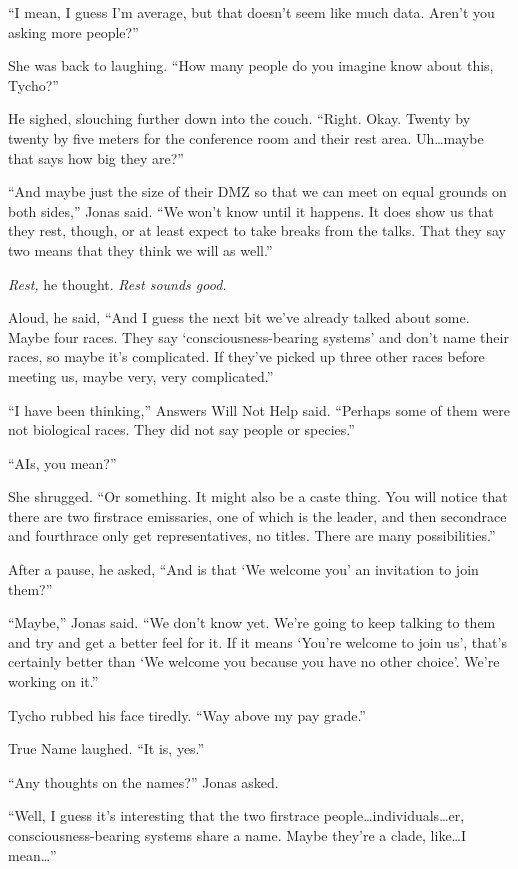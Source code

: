 ``I mean, I guess I'm average, but that doesn't seem like much data. Aren't you asking more people?''

She was back to laughing. ``How many people do you imagine know about this, Tycho?''

He sighed, slouching further down into the couch. ``Right. Okay. Twenty by twenty by five meters for the conference room and their rest area. Uh\ldots maybe that says how big they are?''

``And maybe just the size of their DMZ so that we can meet on equal grounds on both sides,'' Jonas said. ``We won't know until it happens. It does show us that they rest, though, or at least expect to take breaks from the talks. That they say two means that they think we will as well.''

\emph{Rest,} he thought. \emph{Rest sounds good.}

Aloud, he said, ``And I guess the next bit we've already talked about some. Maybe four races. They say `consciousness-bearing systems' and don't name their races, so maybe it's complicated. If they've picked up three other races before meeting us, maybe very, very complicated.''

``I have been thinking,'' Answers Will Not Help said. ``Perhaps some of them were not biological races. They did not say people or species.''

``AIs, you mean?''

She shrugged. ``Or something. It might also be a caste thing. You will notice that there are two firstrace emissaries, one of which is the leader, and then secondrace and fourthrace only get representatives, no titles. There are many possibilities.''

After a pause, he asked, ``And is that `We welcome you' an invitation to join them?''

``Maybe,'' Jonas said. ``We don't know yet. We're going to keep talking to them and try and get a better feel for it. If it means `You're welcome to join us', that's certainly better than `We welcome you because you have no other choice'. We're working on it.''

Tycho rubbed his face tiredly. ``Way above my pay grade.''

True Name laughed. ``It is, yes.''

``Any thoughts on the names?'' Jonas asked.

``Well, I guess it's interesting that the two firstrace people\ldots individuals\ldots er, consciousness-bearing systems share a name. Maybe they're a clade, like\ldots I mean\ldots{}''

